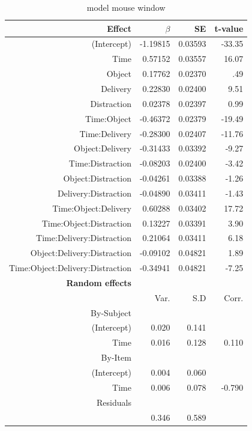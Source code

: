 \documentclass[man]{apa6}
\begin{document}
\begin{table}
\begin{tabular}{rrrr}
\hline
Effect & $\beta$ & SE & t-value\\
\hline
(Intercept) & -1.19815 & 0.03593 & -33.35\\
Time & 0.57152 & 0.03557 & 16.07\\
Object & 0.17762 & 0.02370 & .49\\
Delivery & 0.22830 & 0.02400 & 9.51\\
Distraction & 0.02378 & 0.02397 & 0.99\\
Time:Object & -0.46372 & 0.02379 & -19.49\\
Time:Delivery & -0.28300 & 0.02407 & -11.76\\
Object:Delivery & -0.31433 & 0.03392 & -9.27\\
Time:Distraction & -0.08203 & 0.02400 & -3.42\\
Object:Distraction & -0.04261 & 0.03388 & -1.26\\
Delivery:Distraction & -0.04890 & 0.03411 & -1.43\\
Time:Object:Delivery & 0.60288 & 0.03402 & 17.72\\
Time:Object:Distraction & 0.13227 & 0.03391 & 3.90\\
Time:Delivery:Distraction & 0.21064 & 0.03411 & 6.18\\
Object:Delivery:Distraction & -0.09102 & 0.04821 & 1.89\\
Time:Object:Delivery:Distraction & -0.34941 & 0.04821 & -7.25\\
\hline
\textbf{Random effects} & & & \\
& Var. & S.D & Corr. \\
By-Subject & & &\\
(Intercept) & 0.020 & 0.141 &\\
Time & 0.016 & 0.128 & 0.110 \\
By-Item & & &\\
(Intercept) & 0.004 & 0.060 &\\
Time & 0.006 & 0.078 & -0.790 \\
Residuals & & & \\
& 0.346 & 0.589 & \\
\hline\end{tabular}
\caption{model mouse window}
\label{table:modelmouse}
\end{table}

\newpage
\end{document}
